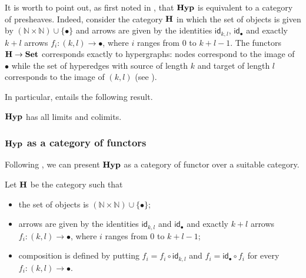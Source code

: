 \documentclass[a4paper,UKenglish,cleveref,pdftex,thm-restate,numberwithinsect]{lipics-v2021}
\newcommand{\Set}{\mathbf{Set}}
\newcommand{\catname}[1]{\textbf{\textup{#1}}}
\newcommand{\hyp}{\catname{Hyp}}
\newcommand{\id}[1]{\mathsf{id}_{#1}}
\begin{document}
\begin{remark}\label{rem:functor}
	It is worth to point out, as first noted in \cite{bonchi2022string}, that $\hyp$ is equivalent to a category of presheaves. 
	Indeed, consider the category $\catname{H}$ in which the set of objects is given by $ (\mathbb{N}\times \mathbb{N}) \cup \{\bullet\}$ and arrows are given by the identities $\id{k,l}$, $\id{\bullet}$ and exactly $k+l$ arrows $f_i\colon (k,l)\rightarrow \bullet$, where $i$ ranges from $0$ to $k+l-1$. 
	The functors $\catname{H}\to \Set$ corresponds exactly to hypergraphs: nodes correspond to the image of $\bullet$ while the set of hyperedges with source of length $k$ and target of length $l$ corresponds to the image of $(k,l)$ (see \cite{CastelnovoGM24}).
\end{remark}

In particular,  entails the following result. 

\begin{proposition}\label{prop:cocomp}
	$\hyp$ has all limits and colimits.
\end{proposition}

\iffalse
\subsubsection{$\hyp$ as a category of functors}

Following \cite{bonchi2022string}, we can present $\hyp$ as a category of functor over a suitable category.

\begin{definition}Let $\catname{H}$ be the category such that
	\begin{itemize}
		\item the set of objects is $ (\mathbb{N}\times \mathbb{N}) \cup \{\bullet\}$;
		\item arrows are given by the identities $\id{k,l}$ and $\id{\bullet}$ and exactly $k+l$ arrows $f_i\colon (k,l)\rightarrow \bullet$, where $i$ ranges from $0$ to $k+l-1$;
		\item composition is defined by putting
			$f_i=f_i\circ \id{k,l}$ and $f_i = \id{\bullet}\circ f_i$
		for every $f_i\colon (k,l)\rightarrow \bullet$.
	\end{itemize}
\end{definition}
\end{document}
